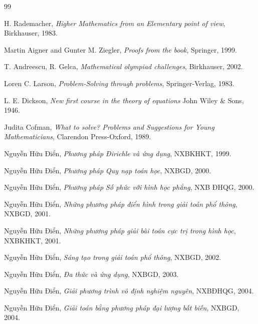 
\begin{thebibliography}{99}
%
H. Rademacher,
{\it Higher Mathematics from an Elementary point of view},
Birkhauser, 1983.

Martin Aigner  and Gunter M. Ziegler,
{\it Proofs from the book},
Springer, 1999.

T. Andreescu, R. Gelca,
{\it Mathematical olympiad challenges},  Birkhauser, 2002. 

Loren C. Larson,
{\it Problem-Solving through problems},
Springer-Verlag, 1983.

L. E. Dickson,
{\it New first course in the theory of equations}
John Wiley \& Sons, 1946.

Judita Cofman,
{\it What to solve? Problems and Suggestions for Young Mathematicians},
Clarendon Press-Oxford, 1989.

Nguyễn Hữu Điển,
{\it Phương pháp Đirichle và ứng dụng},
NXBKHKT, 1999.

Nguyễn Hữu  Điển,
{\it Phương pháp Quy nạp toán học},
NXBGD, 2000.

Nguyễn Hữu  Điển,
{\it Phương pháp Số phức với hình học phẳng},
NXB ĐHQG, 2000.

Nguyễn Hữu  Điển,
{\it Những phương pháp điển hình trong giải toán phổ thông},
NXBGD, 2001.

Nguyễn Hữu  Điển,
{\it Những phương pháp giải bài toán cực trị trong hình học},
NXBKHKT, 2001.

Nguyễn Hữu  Điển,
{\it Sáng tạo trong giải toán phổ thông},
NXBGD, 2002.

Nguyễn Hữu  Điển,
{\it Đa thức và ứng dụng},
NXBGD, 2003.

Nguyễn Hữu  Điển,
{\it Giải phương trình vô định nghiệm nguyên},
NXBĐHQG, 2004.

Nguyễn Hữu  Điển,
{\it Giải toán bằng phương pháp đại lượng bất biến},
NXBGD, 2004.


\end{thebibliography}


